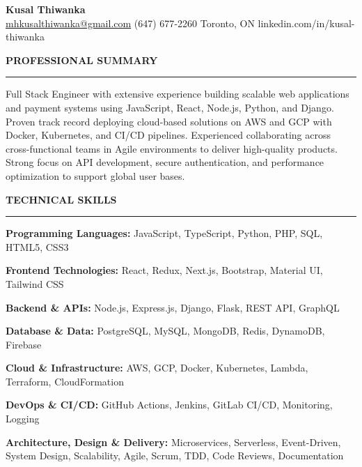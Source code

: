 \documentclass[10pt,letterpaper]{article}
\begin{document}
\begin{center}
{\LARGE\textbf{Kusal Thiwanka}}\\[3pt]
\href{mailto:mhkusalthiwanka@gmail.com}{mhkusalthiwanka@gmail.com}\hspace{2em}%
(647) 677{-}2260\hspace{2em}%
Toronto, ON\hspace{2em}
linkedin.com/in/kusal-thiwanka
\end{center}

\vspace{6pt}

\textbf{PROFESSIONAL SUMMARY}\\[-8pt]
\noindent\rule{\textwidth}{1pt}

\vspace{-2pt}

Full Stack Engineer with extensive experience building scalable web applications and payment systems using JavaScript, React, Node.js, Python, and Django. Proven track record deploying cloud-based solutions on AWS and GCP with Docker, Kubernetes, and CI/CD pipelines. Experienced collaborating across cross-functional teams in Agile environments to deliver high-quality products. Strong focus on API development, secure authentication, and performance optimization to support global user bases.

\vspace{8pt}

\textbf{TECHNICAL SKILLS}\\[-8pt]
\noindent\rule{\textwidth}{1pt}

\vspace{-2pt}

\textbf{Programming Languages:} JavaScript, TypeScript, Python, PHP, SQL, HTML5, CSS3

\textbf{Frontend Technologies:} React, Redux, Next.js, Bootstrap, Material UI, Tailwind CSS

\textbf{Backend \& APIs:} Node.js, Express.js, Django, Flask, REST API, GraphQL

\textbf{Database \& Data:} PostgreSQL, MySQL, MongoDB, Redis, DynamoDB, Firebase

\textbf{Cloud \& Infrastructure:} AWS, GCP, Docker, Kubernetes, Lambda, Terraform, CloudFormation

\textbf{DevOps \& CI/CD:} GitHub Actions, Jenkins, GitLab CI/CD, Monitoring, Logging

\textbf{Architecture, Design \& Delivery:} Microservices, Serverless, Event-Driven, System Design, Scalability, Agile, Scrum, TDD, Code Reviews, Documentation
\end{document}
